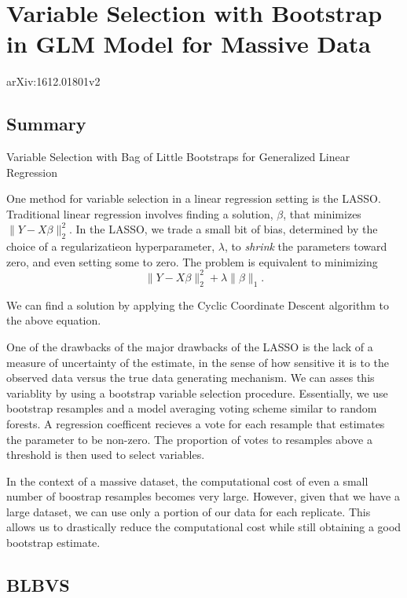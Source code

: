 \documentclass[11pt]{article}
\author{John Honaker}
\date{\today}
\title{}
\begin{document}
\tableofcontents

\section{Variable Selection with Bootstrap in GLM Model for Massive Data}
\label{sec:org6c1ea59}
arXiv:1612.01801v2

\subsection{Summary}
\label{sec:orgf5d5bf6}

Variable Selection with Bag of Little Bootstraps for Generalized Linear Regression

One method for variable selection in a linear regression setting is the LASSO. Traditional linear regression involves finding a solution, \(\beta\), that minimizes \(\| Y - X\beta \|^2_2\). In the LASSO, we trade a small bit of bias, determined by the choice of a regularizatieon hyperparameter, \(\lambda\), to \emph{shrink} the parameters toward zero, and even setting some to zero. The problem is equivalent to minimizing $$ \|Y - X\beta \|^2_2 + \lambda \| \beta \|_1.$$


We can find a solution by applying the Cyclic Coordinate Descent algorithm to the above equation.

One of the drawbacks of the major drawbacks of the LASSO is the lack of a measure of uncertainty of the estimate, in the sense of how sensitive it is to the observed data versus the true data generating mechanism. We can asses this variablity by using a bootstrap variable selection procedure. Essentially, we use bootstrap resamples and a model averaging voting scheme similar to random forests. A regression coefficent recieves a vote for each resample that estimates the parameter to be non-zero. The proportion of votes to resamples above a threshold is then used to select variables.

In the context of a massive dataset, the computational cost of even a small number of boostrap resamples becomes very large. However, given that we have a large dataset, we can use only a portion of our data for each replicate. This allows us to drastically reduce the computational cost while still obtaining a good bootstrap estimate.

\subsection{BLBVS}
\label{sec:org216ad25}
\end{document}
